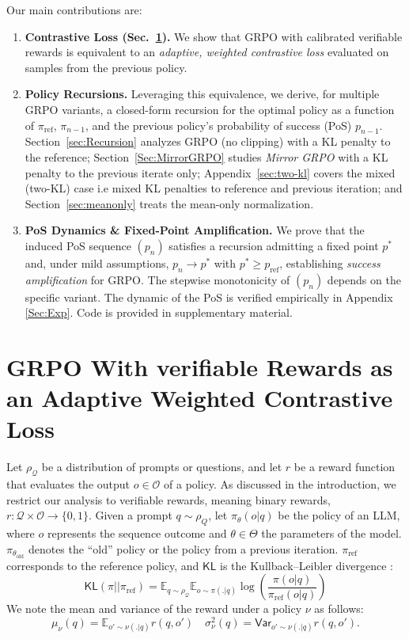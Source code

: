 \documentclass[11pt,reqno]{amsart}
\begin{document}
Our main contributions are:
\begin{enumerate}
\item \textbf{Contrastive Loss (Sec.~\ref{sec:CL}).}
We show that GRPO with calibrated verifiable rewards is equivalent to an \emph{adaptive, weighted contrastive loss} evaluated on samples from the previous policy.

\item \textbf{Policy Recursions.}
Leveraging this equivalence, we derive, for multiple GRPO variants, a closed-form recursion for the optimal policy as a function of $\pi_{\mathrm{ref}}$, $\pi_{n-1}$, and the previous policy’s probability of success (PoS) $p_{n-1}$.
Section~\ref{sec:Recursion} analyzes GRPO (no clipping) with a KL penalty to the reference; Section~\ref{Sec:MirrorGRPO} studies \emph{Mirror GRPO} with a KL penalty to the previous iterate only; Appendix~\ref{sec:two-kl} covers the mixed (two-KL) case i.e mixed KL penalties to reference and previous iteration; and Section~\ref{sec:meanonly} treats the mean-only normalization.

\item \textbf{PoS Dynamics \& Fixed-Point Amplification.}
We prove that the induced PoS sequence $(p_n)$ satisfies a recursion admitting a fixed point $p^*$ and, under mild assumptions, $p_n \to p^*$ with $p^* \ge p_{\mathrm{ref}}$, establishing \emph{success amplification} for GRPO. The stepwise monotonicity of $(p_n)$ depends on the specific variant. The dynamic of the PoS is verified empirically in Appendix \ref{Sec:Exp}. Code is provided in supplementary material. 
\end{enumerate}



\section{ GRPO With verifiable Rewards as an Adaptive Weighted Contrastive Loss } \label{sec:CL}


Let $\rho_{\mathcal{Q}}$ be a distribution of prompts or questions, and let $r$ be a reward function that evaluates the output $o \in \mathcal{O}$ of a  policy. As discussed in the introduction, we restrict our analysis to verifiable rewards, meaning binary rewards, $r: \mathcal{Q}\times \mathcal{O} \to \{0,1\}$.   Given a prompt $q \sim \rho_{Q}$, let $\pi_{\theta} (o|q)$ be the policy of an LLM, where $o$ represents the sequence outcome and  $\theta \in \Theta$ the parameters of the model. $\pi_{\theta_{\text{old}}}$ denotes the ``old'' policy or the policy from a previous iteration. $\pi_{\mathrm{ref}}$ corresponds to the reference policy, and $\mathsf{KL}$ is the  Kullback–Leibler divergence :
\[ \mathsf{KL} ( \pi || \pi_{\mathrm{ref}}) = \mathbb{E}_{q\sim\rho_{\mathcal{Q}} }\mathbb{E}_{o\sim \pi (.|q)} \log\left(\frac{ \pi (o|q)}{ \pi_{\text{ref}}(o|q)}\right) \]
We note the mean and variance of the reward under a policy $\nu$ as follows: 
\[ \mu_{\nu}(q)=\mathbb{E}_{o' \sim \nu (.|q)} r(q,o') \quad \sigma^2_{\nu}(q)= \mathsf{Var}_ {o' \sim \nu(.|q)} r(q,o').  \]
\end{document}
